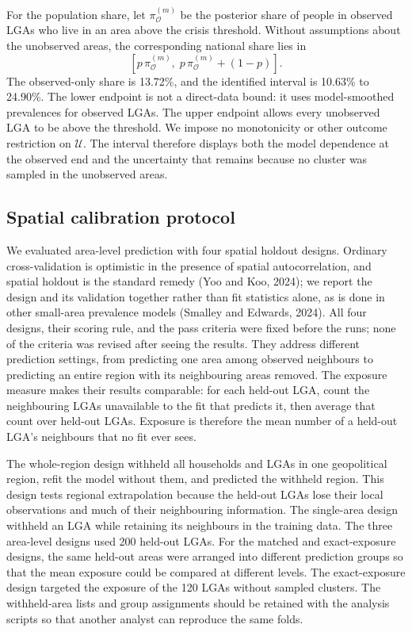 For the population share, let \(\pi_{\mathcal{O}}^{(m)}\) be the posterior share of people in observed LGAs who live in an area above the crisis threshold. Without assumptions about the unobserved areas, the corresponding national share lies in
\[
  \left[
    p\,\pi_{\mathcal{O}}^{(m)},\;
    p\,\pi_{\mathcal{O}}^{(m)}+(1-p)
  \right].
\]
The observed-only share is 13.72\%, and the identified interval is 10.63\% to 24.90\%. The lower endpoint is not a direct-data bound: it uses model-smoothed prevalences for observed LGAs. The upper endpoint allows every unobserved LGA to be above the threshold. We impose no monotonicity or other outcome restriction on \(\mathcal{U}\). The interval therefore displays both the model dependence at the observed end and the uncertainty that remains because no cluster was sampled in the unobserved areas.

\subsection{Spatial calibration protocol}

We evaluated area-level prediction with four spatial holdout designs. Ordinary cross-validation is optimistic in the presence of spatial autocorrelation, and spatial holdout is the standard remedy (Yoo and Koo, 2024); we report the design and its validation together rather than fit statistics alone, as is done in other small-area prevalence models (Smalley and Edwards, 2024). All four designs, their scoring rule, and the pass criteria were fixed before the runs; none of the criteria was revised after seeing the results. They address different prediction settings, from predicting one area among observed neighbours to predicting an entire region with its neighbouring areas removed. The exposure measure makes their results comparable: for each held-out LGA, count the neighbouring LGAs unavailable to the fit that predicts it, then average that count over held-out LGAs. Exposure is therefore the mean number of a held-out LGA's neighbours that no fit ever sees.

The whole-region design withheld all households and LGAs in one geopolitical region, refit the model without them, and predicted the withheld region. This design tests regional extrapolation because the held-out LGAs lose their local observations and much of their neighbouring information. The single-area design withheld an LGA while retaining its neighbours in the training data. The three area-level designs used 200 held-out LGAs. For the matched and exact-exposure designs, the same held-out areas were arranged into different prediction groups so that the mean exposure could be compared at different levels. The exact-exposure design targeted the exposure of the 120 LGAs without sampled clusters. The withheld-area lists and group assignments should be retained with the analysis scripts so that another analyst can reproduce the same folds.

